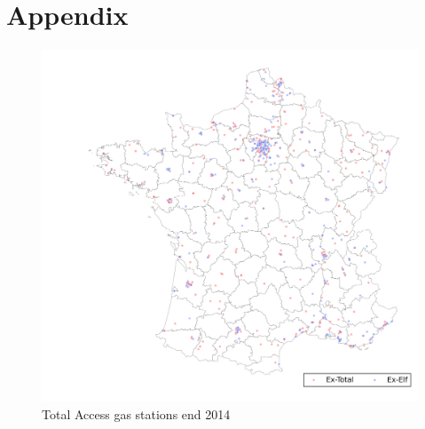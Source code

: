 \documentclass[english]{article}
\begin{document}
\newpage



\newpage

\appendix

\section{Appendix}

\begin{figure}[H]
	\centering
		\includegraphics[width=16cm]{graphs/map_total_access.png}
	\floatfoot{}
\caption{Total Access gas stations end 2014}
\label{figure:map_ta}
\end{figure}
\end{document}
